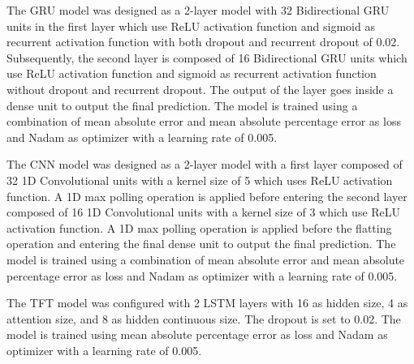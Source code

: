 The GRU model was designed as a 2-layer model with 32 Bidirectional GRU units in the first layer which use ReLU activation function and sigmoid as recurrent activation function with both dropout and recurrent dropout of 0.02.
Subsequently, the second layer is composed of 16 Bidirectional GRU units which use ReLU activation function and sigmoid as recurrent activation function without dropout and recurrent dropout.
The output of the layer goes inside a dense unit to output the final prediction.
The model is trained using a combination of mean absolute error and mean absolute percentage error as loss and Nadam as optimizer with a learning rate of 0.005.

The CNN model was designed as a 2-layer model with a first layer composed of 32 1D Convolutional units with a kernel size of 5 which uses ReLU activation function.
A 1D max polling operation is applied before entering the second layer composed of 16 1D Convolutional units with a kernel size of 3 which use ReLU activation function.
A 1D max polling operation is applied before the flatting operation and entering the final dense unit to output the final prediction.
The model is trained using a combination of mean absolute error and mean absolute percentage error as loss and Nadam as optimizer with a learning rate of 0.005.

The TFT model was configured with 2 LSTM layers with 16 as hidden size, 4 as attention size, and 8 as hidden continuous size.
The dropout is set to 0.02.
The model is trained using mean absolute percentage error as loss and Nadam as optimizer with a learning rate of 0.005.

